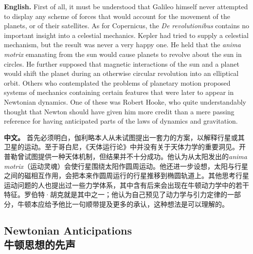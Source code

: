 \noindent\textbf{English.} First of all, it must be understood that Galileo himself never attempted to display any scheme of forces that would account for the movement of the planets, or of their satellites. As for Copernicus, the \emph{De revolutionibus} contains no important insight into a celestial mechanics. Kepler had tried to supply a celestial mechanism, but the result was never a very happy one. He held that the \emph{anima motrix} emanating from the sun would cause planets to revolve about the sun in circles. He further supposed that magnetic interactions of the sun and a planet would shift the planet during an otherwise circular revolution into an elliptical orbit. Others who contemplated the problems of planetary motion proposed systems of mechanics containing certain features that were later to appear in Newtonian dynamics. One of these was Robert Hooke, who quite understandably thought that Newton should have given him more credit than a mere passing reference for having anticipated parts of the laws of dynamics and gravitation.
\par\noindent\textbf{中文。} 首先必须明白，伽利略本人从未试图提出一套力的方案，以解释行星或其卫星的运动。至于哥白尼，《天体运行论》中并没有关于天体力学的重要洞见。开普勒曾试图提供一种天体机制，但结果并不十分成功。他认为从太阳发出的\emph{anima motrix}（运动灵魂）会使行星围绕太阳作圆周运动。他还进一步设想，太阳与行星之间的磁相互作用，会把本来作圆周运行的行星推移到椭圆轨道上。其他思考行星运动问题的人也提出过一些力学体系，其中含有后来会出现在牛顿动力学中的若干特征。罗伯特·胡克就是其中之一；他认为自己预见了动力学与引力定律的一部分，牛顿本应给予他比一句顺带提及更多的承认，这种想法是可以理解的。
\medskip

\subsection*{Newtonian Anticipations\\牛顿思想的先声}

